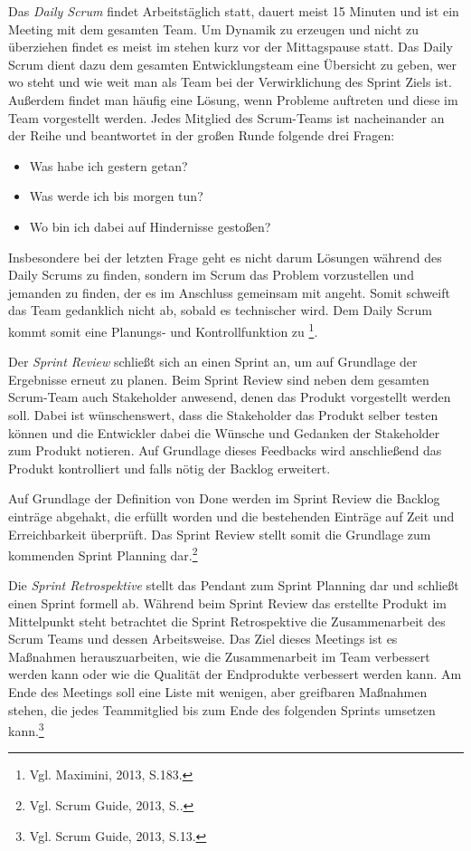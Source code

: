                 Das \emph{Daily Scrum} findet Arbeitstäglich statt, dauert meist 15 Minuten und ist ein Meeting mit dem gesamten Team. Um Dynamik zu erzeugen und nicht zu überziehen findet es meist im stehen kurz vor der Mittagspause statt. Das Daily Scrum dient dazu dem gesamten Entwicklungsteam eine Übersicht zu geben, wer wo steht und wie weit man als Team bei der Verwirklichung des Sprint Ziels ist. Außerdem findet man häufig eine Lösung, wenn Probleme auftreten und diese im Team vorgestellt werden. Jedes Mitglied des Scrum-Teams ist nacheinander an der Reihe und beantwortet in der großen Runde folgende drei Fragen:

                \begin{itemize}
                  \item Was habe ich gestern getan?
                  \item Was werde ich bis morgen tun?
                  \item Wo bin ich dabei auf Hindernisse gestoßen?
                \end{itemize}

                Insbesondere bei der letzten Frage geht es nicht darum Lösungen während des Daily Scrums zu finden, sondern im Scrum das Problem vorzustellen und jemanden zu finden, der es im Anschluss gemeinsam mit angeht. Somit schweift das Team gedanklich nicht ab, sobald es technischer wird. Dem Daily Scrum kommt somit eine Planungs- und Kontrollfunktion zu \footnote{Vgl. Maximini, 2013, S.183.}.

                Der \emph{Sprint Review} schließt sich an einen Sprint an, um auf Grundlage der Ergebnisse erneut zu planen. Beim Sprint Review sind neben dem gesamten Scrum-Team auch Stakeholder anwesend, denen das Produkt vorgestellt werden soll. Dabei ist wünschenswert, dass die Stakeholder das Produkt selber testen können und die Entwickler dabei die Wünsche und Gedanken der Stakeholder zum Produkt notieren. Auf Grundlage dieses Feedbacks wird anschließend das Produkt kontrolliert und falls nötig der Backlog erweitert.

                Auf Grundlage der Definition von Done werden im Sprint Review die Backlog einträge abgehakt, die erfüllt worden und die bestehenden Einträge auf Zeit und Erreichbarkeit überprüft. Das Sprint Review stellt somit die Grundlage zum kommenden Sprint Planning dar.\footnote{Vgl. Scrum Guide, 2013, S..}

                Die \emph{Sprint Retrospektive} stellt das Pendant zum Sprint Planning dar und schließt einen Sprint formell ab. Während beim Sprint Review das erstellte Produkt im Mittelpunkt steht betrachtet die Sprint Retrospektive die Zusammenarbeit des Scrum Teams und dessen Arbeitsweise. Das Ziel dieses Meetings ist es Maßnahmen herauszuarbeiten, wie die Zusammenarbeit im Team verbessert werden kann oder wie die Qualität der Endprodukte verbessert werden kann. Am Ende des Meetings soll eine Liste mit wenigen, aber greifbaren Maßnahmen stehen, die jedes Teammitglied bis zum Ende des folgenden Sprints umsetzen kann.\footnote{Vgl. Scrum Guide, 2013, S.13.}

